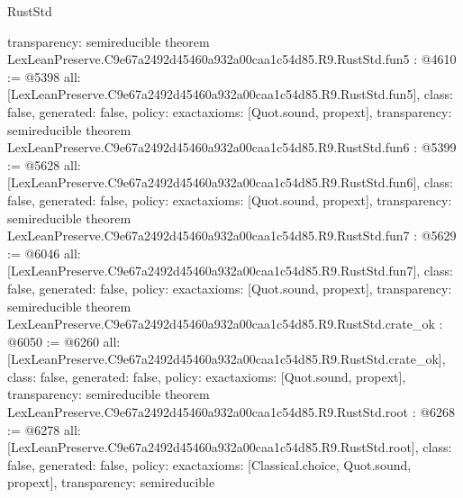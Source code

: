 \begin{lexlean}{RustStd}
\begin{coremodule}
{  transparency: semireducible
}
theorem LexLeanPreserve.C9e67a2492d45460a932a00caa1c54d85.R9.RustStd.fun5 : @4610 := @5398 {
  all: [LexLeanPreserve.C9e67a2492d45460a932a00caa1c54d85.R9.RustStd.fun5],
  class: false,
  generated: false,
  policy: exact{axioms: [Quot.sound, propext]},
  transparency: semireducible
}
theorem LexLeanPreserve.C9e67a2492d45460a932a00caa1c54d85.R9.RustStd.fun6 : @5399 := @5628 {
  all: [LexLeanPreserve.C9e67a2492d45460a932a00caa1c54d85.R9.RustStd.fun6],
  class: false,
  generated: false,
  policy: exact{axioms: [Quot.sound, propext]},
  transparency: semireducible
}
theorem LexLeanPreserve.C9e67a2492d45460a932a00caa1c54d85.R9.RustStd.fun7 : @5629 := @6046 {
  all: [LexLeanPreserve.C9e67a2492d45460a932a00caa1c54d85.R9.RustStd.fun7],
  class: false,
  generated: false,
  policy: exact{axioms: [Quot.sound, propext]},
  transparency: semireducible
}
theorem LexLeanPreserve.C9e67a2492d45460a932a00caa1c54d85.R9.RustStd.crate_ok : @6050 := @6260 {
  all: [LexLeanPreserve.C9e67a2492d45460a932a00caa1c54d85.R9.RustStd.crate_ok],
  class: false,
  generated: false,
  policy: exact{axioms: [Quot.sound, propext]},
  transparency: semireducible
}
theorem LexLeanPreserve.C9e67a2492d45460a932a00caa1c54d85.R9.RustStd.root : @6268 := @6278 {
  all: [LexLeanPreserve.C9e67a2492d45460a932a00caa1c54d85.R9.RustStd.root],
  class: false,
  generated: false,
  policy: exact{axioms: [Classical.choice, Quot.sound, propext]},
  transparency: semireducible
}


\end{coremodule}
\end{lexlean}
